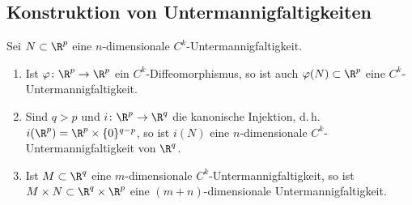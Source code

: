 \documentclass[11pt]{article}
\begin{document}
\subsection{Konstruktion von Untermannigfaltigkeiten}

\begin{proposition}[Konstruktionen]\Theorem
  Sei $N \subset \R^p$ eine $n$-dimensionale $C^k$-Untermannigfaltigkeit.
  \begin{enumerate}[label=(\roman*)]
    \item Ist $\varphi\colon \R^p \to \R^p$ ein $C^k$-Diffeomorphismus, so ist auch $\varphi(N) \subset \R^p$ eine $C^k$-Untermannigfaltigkeit.
    \item Sind $q > p$ und $i\colon \R^p \to \R^q$ die kanonische Injektion, d.\,h. $i(\R^p) = \R^p \times \{0\}^{q-p}$, so ist $i(N)$ eine $n$-dimensionale $C^k$-Untermannigfaltigkeit von $\R^q$.
    \item Ist $M \subset \R^q$ eine $m$-dimensionale $C^k$-Untermannigfaltigkeit, so ist $M \times N \subset \R^q \times \R^p$ eine $(m+n)$-dimensionale Untermannigfaltigkeit.
\end{enumerate}
\end{proposition}
\end{document}
